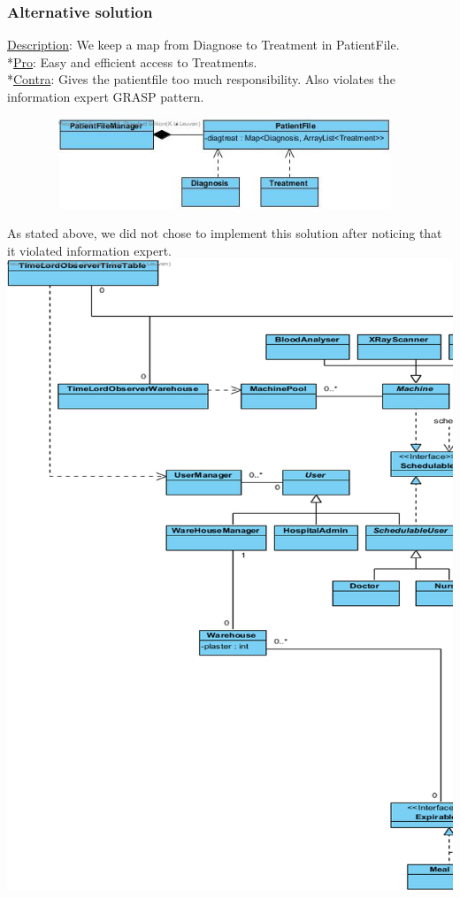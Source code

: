 \documentclass[11pt]{article}
\begin{document}
\subsubsection{Alternative solution}
\underline{Description}: We keep a map from Diagnose to Treatment in PatientFile.
\\*\underline{Pro}: Easy and efficient access to Treatments.
\\*\underline{Contra}: Gives the patientfile too much responsibility. Also violates the information expert GRASP pattern. 
\begin{center}
\includegraphics[width=130mm, height=27mm]{patientfilediagfail.jpg}
\end{center}
As stated above, we did not chose to implement this solution after noticing that it violated information expert.\\
\includegraphics[width=170mm]{left1.png}\\
\end{document}
